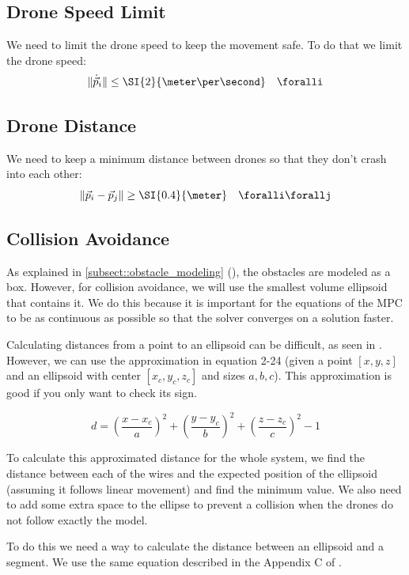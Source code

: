 \subsection{Drone Speed Limit}
We need to limit the drone speed to keep the movement safe. To do that we limit the drone speed:
\begin{equation}
\|\dot{\vec p}_i\|\le \SI{2}{\meter\per\second}\quad\foralli
\end{equation}
\subsection{Drone Distance}
We need to keep a minimum distance between drones so that they don't crash into each other:
\begin{equation}
\|\vec p_i - \vec p_j\|\ge \SI{0.4}{\meter}\quad\foralli\forallj
\end{equation}
\subsection{Collision Avoidance}
As explained in \cref{subsect::obstacle_modeling} (), the obstacles are modeled as a box. However, for collision avoidance, we will use the smallest volume ellipsoid that contains it. We do this because it is important for the equations of the \ac{MPC} to be as continuous as possible so that the solver converges on a solution faster.

Calculating distances from a point to an ellipsoid can be difficult, as seen in \cite{MAISONOBE2006}. However, we can use the approximation in equation 2-24 (given a point $[x,y,z]$ and an ellipsoid with center $[x_c,y_c,z_c]$ and sizes $a,b,c$). This approximation is good if you only want to check its sign.

\begin{equation}
d = 
\left(\frac{x-x_c}{a}\right)^2+
\left(\frac{y-y_c}{b}\right)^2+
\left(\frac{z-z_c}{c}\right)^2-1
\end{equation}

To calculate this approximated distance for the whole system, we find the distance between each of the wires and the expected position of the ellipsoid (assuming it follows linear movement) and find the minimum value. We also need to add some extra space to the ellipse to prevent a collision when the drones do not follow exactly the model.

To do this we need a way to calculate the distance between an ellipsoid and a segment. We use the same equation described in the Appendix C of \cite{Potdar2018}.

